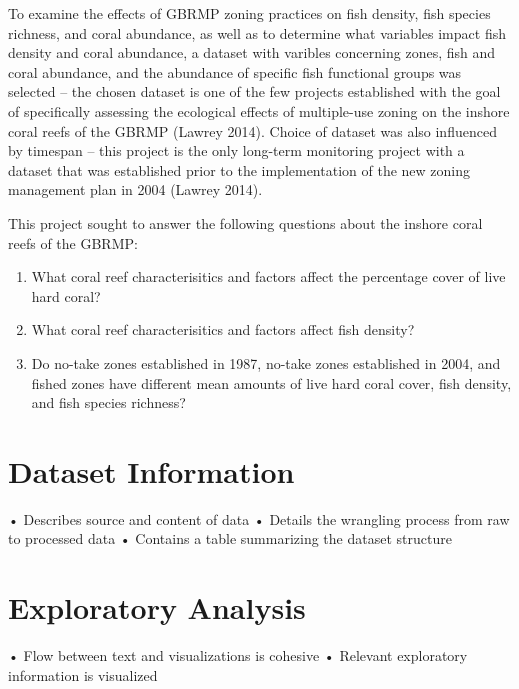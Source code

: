 \documentclass[12pt,]{article}
\providecommand{\tightlist}{%
  \setlength{\itemsep}{0pt}\setlength{\parskip}{0pt}}
\begin{document}
To examine the effects of GBRMP zoning practices on fish density, fish
species richness, and coral abundance, as well as to determine what
variables impact fish density and coral abundance, a dataset with
varibles concerning zones, fish and coral abundance, and the abundance
of specific fish functional groups was selected -- the chosen dataset is
one of the few projects established with the goal of specifically
assessing the ecological effects of multiple-use zoning on the inshore
coral reefs of the GBRMP (Lawrey 2014). Choice of dataset was also
influenced by timespan -- this project is the only long-term monitoring
project with a dataset that was established prior to the implementation
of the new zoning management plan in 2004 (Lawrey 2014).

This project sought to answer the following questions about the inshore
coral reefs of the GBRMP:

\begin{enumerate}
\def\labelenumi{\arabic{enumi}.}
\tightlist
\item
  What coral reef characterisitics and factors affect the percentage
  cover of live hard coral?
\item
  What coral reef characterisitics and factors affect fish density?
\item
  Do no-take zones established in 1987, no-take zones established in
  2004, and fished zones have different mean amounts of live hard coral
  cover, fish density, and fish species richness?
\end{enumerate}

\newpage

\hypertarget{dataset-information}{%
\section{Dataset Information}\label{dataset-information}}

• Describes source and content of data • Details the wrangling process
from raw to processed data • Contains a table summarizing the dataset
structure

\newpage

\hypertarget{exploratory-analysis}{%
\section{Exploratory Analysis}\label{exploratory-analysis}}

• Flow between text and visualizations is cohesive • Relevant
exploratory information is visualized
\end{document}
